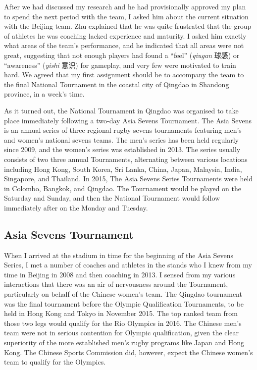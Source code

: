 \begin{CJK}{UTF8}{gbsn}
After we had discussed my research and he had provisionally approved my plan to spend the next period with the team, I asked him about the current situation with the Beijing team.  Zhu explained that he was quite frustrated that the group of athletes he was coaching lacked experience and maturity. I asked him exactly what areas of the team's performance, and he indicated that all areas were not great, suggesting that not enough players had found a ``feel'' (\textit{qiugan} 球感) or ``awareness'' (\textit{yishi} 意识) for gameplay, and very few were motivated to train hard.  We agreed that my first assignment should be to accompany the team to the final National Tournament in the coastal city of Qingdao in Shandong province, in a week's time.

As it turned out, the National Tournament in Qingdao was organised to take place immediately following a two-day Asia Sevens Tournament.  The Asia Sevens is an annual series of three regional rugby sevens tournaments featuring men's and women's national sevens teams.  The men's series has been held regularly since 2009, and the women's series was established in 2013. The series usually consists of two three annual Tournaments, alternating between various locations including Hong Kong, South Korea, Sri Lanka, China, Japan, Malaysia, India, Singapore, and Thailand.  In 2015, The Asia Sevens Series Tournaments were held in Colombo, Bangkok, and Qingdao. The Tournament would be played on the Saturday and Sunday, and then the National Tournament would follow immediately after on the Monday and Tuesday.

\subsection{Asia Sevens Tournament}
When I arrived at the stadium in time for the beginning of the Asia Sevens Series, I met a number of coaches and athletes in the stands who I knew from my time in Beijing in 2008 and then coaching in 2013. I sensed from my various interactions that there was an air of nervousness around the Tournament, particularly on behalf of the Chinese women's team.   The Qingdao tournament was the final tournament before the Olympic Qualification Tournaments, to be held in Hong Kong and Tokyo in November 2015.  The top ranked team from those two legs would qualify for the Rio Olympics in 2016.  The Chinese men's team were not in serious contention for Olympic qualification, given the clear superiority of the more established men's rugby programs like Japan and Hong Kong. The Chinese Sports Commission did, however, expect the Chinese women's team to qualify for the Olympics.


\end{CJK}
